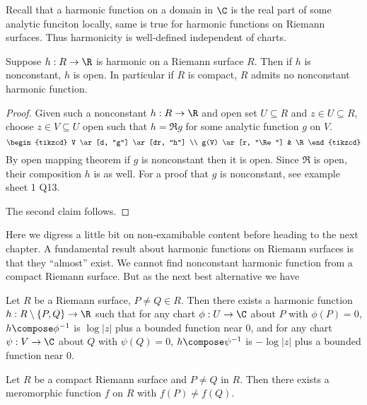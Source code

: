 \documentclass[a4paper]{article}
\begin{document}
Recall that a harmonic function on a domain in \(\C\) is the real part of some analytic funciton locally, same is true for harmonic functions on Riemann surfaces. Thus harmonicity is well-defined independent of charts.

\begin{proposition}
  Suppose \(h: R \to \R\) is harmonic on a Riemann surface \(R\). Then if \(h\) is nonconstant, \(h\) is open. In particular if \(R\) is compact, \(R\) admits no nonconstant harmonic function.
\end{proposition}

\begin{proof}
  Given such a nonconstant \(h: R \to \R\) and open set \(U \subseteq R\) and \(z \in U \subseteq R\), choose \(z \in V \subseteq U\) open such that \(h = \Re g\) for some analytic function \(g\) on \(V\).
  \[
    \begin{tikzcd}
      V \ar[d, "g"] \ar[dr, "h"] \\
      g(V) \ar[r, "\Re"] & \R
    \end{tikzcd}
  \]
  By open mapping theorem if \(g\) is nonconstant then it is open. Since \(\Re\) is open, their composition \(h\) is as well. For a proof that \(g\) is nonconstant, see example sheet 1 Q13.

  The second claim follows.
\end{proof}

Here we digress a little bit on non-examibable content before heading to the next chapter. A fundamental result about harmonic functions on Riemann surfaces is that they ``almost'' exist. We cannot find nonconstant harmonic function from a compact Riemann surface. But as the next best alternative we have

\begin{theorem}
  Let \(R\) be a Riemann surface, \(P \neq Q \in R\). Then there exists a harmonic function \(h: R \setminus \{P, Q\} \to \R\) such that for any chart \(\phi: U \to \C\) about \(P\) with \(\phi(P) = 0\), \(h \compose \phi^{-1}\) is \(\log |z|\) plus a bounded function near \(0\), and for any chart \(\psi: V \to \C\) about \(Q\) with \(\psi(Q) = 0\), \(h \compose \psi^{-1}\) is \(-\log |z|\) plus a bounded function near \(0\).
\end{theorem}

\begin{theorem}
  Let \(R\) be a compact Riemann surface and \(P \neq Q\) in \(R\). Then there exists a meromorphic function \(f\) on \(R\) with \(f(P) \neq f(Q)\).
\end{theorem}
\end{document}

